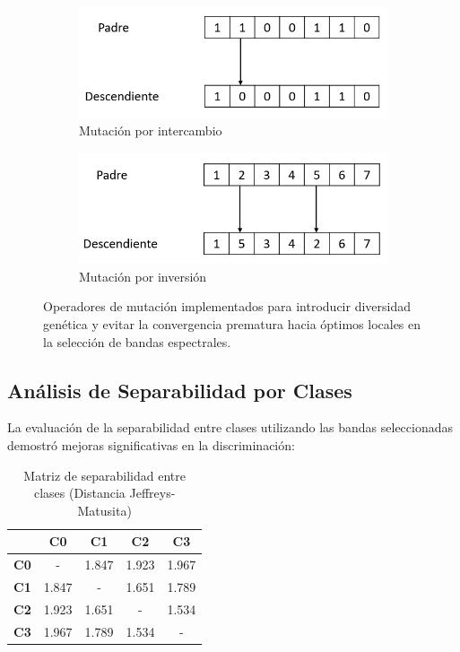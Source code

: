 \begin{figure}[!ht]
\centering
\begin{subfigure}[b]{0.45\textwidth}
    \includegraphics[width=\textwidth]{images/mutacion1.png}
    \caption{Mutación por intercambio}
    \label{fig:mutacion_intercambio}
\end{subfigure}
\hfill
\begin{subfigure}[b]{0.45\textwidth}
    \includegraphics[width=\textwidth]{images/mutacion2.png}
    \caption{Mutación por inversión}
    \label{fig:mutacion_inversion}
\end{subfigure}
\caption{Operadores de mutación implementados para introducir diversidad genética y evitar la convergencia prematura hacia óptimos locales en la selección de bandas espectrales.}
\label{fig:operadores_mutacion}
\end{figure}

\subsection{Análisis de Separabilidad por Clases}

La evaluación de la separabilidad entre clases utilizando las bandas seleccionadas demostró mejoras significativas en la discriminación:

\begin{table}[h!]
\centering
\caption{Matriz de separabilidad entre clases (Distancia Jeffreys-Matusita)}
\begin{tabular}{|c|c|c|c|c|}
\hline
 & \textbf{C0} & \textbf{C1} & \textbf{C2} & \textbf{C3} \\
\hline
\textbf{C0} & - & 1.847 & 1.923 & 1.967 \\
\hline
\textbf{C1} & 1.847 & - & 1.651 & 1.789 \\
\hline
\textbf{C2} & 1.923 & 1.651 & - & 1.534 \\
\hline
\textbf{C3} & 1.967 & 1.789 & 1.534 & - \\
\hline
\end{tabular}
\label{tab:class_separability}
\end{table}

